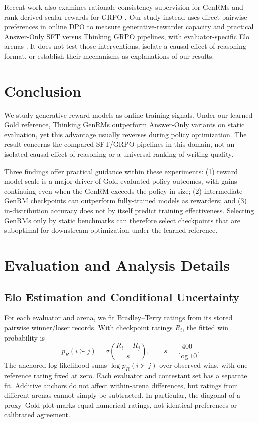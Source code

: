 \documentclass[11pt,letterpaper]{article}
\begin{document}
Recent work also examines rationale-consistency supervision for GenRMs \citep{wang2026rationale} and rank-derived scalar rewards for GRPO \citep{wang2026rrc}. Our study instead uses direct pairwise preferences in online DPO to measure generative-rewarder capacity and practical Answer-Only SFT versus Thinking GRPO pipelines, with evaluator-specific Elo arenas \citep{chatbot-arena-2024}. It does not test those interventions, isolate a causal effect of reasoning format, or establish their mechanisms as explanations of our results.

\section{Conclusion}

We study generative reward models as online training signals. Under our learned Gold reference, Thinking GenRMs outperform Answer-Only variants on static evaluation, yet this advantage usually reverses during policy optimization. The result concerns the compared SFT/GRPO pipelines in this domain, not an isolated causal effect of reasoning or a universal ranking of writing quality.

Three findings offer practical guidance within these experiments: (1) reward model scale is a major driver of Gold-evaluated policy outcomes, with gains continuing even when the GenRM exceeds the policy in size; (2) intermediate GenRM checkpoints can outperform fully-trained models as rewarders; and (3) in-distribution accuracy does not by itself predict training effectiveness. Selecting GenRMs only by static benchmarks can therefore select checkpoints that are suboptimal for downstream optimization under the learned reference.




\clearpage
\appendix


\section{Evaluation and Analysis Details}

\subsection{Elo Estimation and Conditional Uncertainty}
\label{app:elo}

For each evaluator and arena, we fit Bradley--Terry ratings from its stored pairwise winner/loser records. With checkpoint ratings $R_i$, the fitted win probability is
\[
p_R(i\succ j)=\sigma\!\left(\frac{R_i-R_j}{s}\right),
\qquad s=\frac{400}{\log 10}.
\]
The anchored log-likelihood sums $\log p_R(i\succ j)$ over observed wins, with one reference rating fixed at zero. Each evaluator and contestant set has a separate fit. Additive anchors do not affect within-arena differences, but ratings from different arenas cannot simply be subtracted. In particular, the diagonal of a proxy--Gold plot marks equal numerical ratings, not identical preferences or calibrated agreement.
\end{document}
